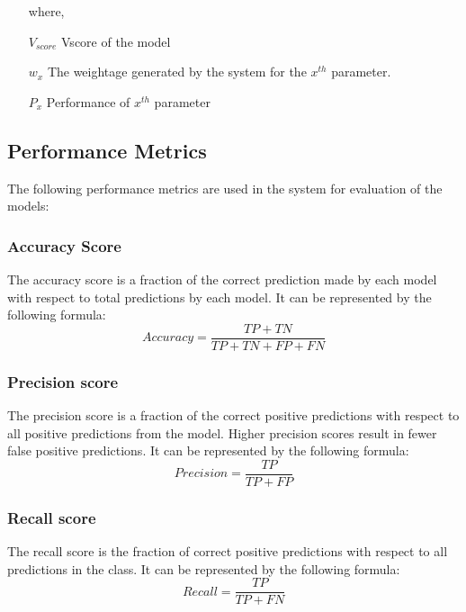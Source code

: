 \documentclass[a4paper,fleqn]{cas-dc}
\newcommand{\responsemod}{\color{blue}}
\begin{document}
{\responsemod
\begin{itemize}
    \item[where,]
    \item[$V_{score}$] Vscore of the model
    \item[$w_x$] The weightage generated by the system for the $x^{th}$ parameter.
    \item[$P_x$] Performance of $x^{th}$ parameter
\end{itemize}

\subsection{Performance Metrics} \label{subsec:performance_metrics}
The following performance metrics are used in the system for evaluation of the models:

\subsubsection{Accuracy Score}\label{subsubsec:accuracy_score}
The accuracy score is a fraction of the correct prediction made by each model with respect to total predictions by each model. It can be represented by the following formula:
\begin{equation*}\label{eq:accuracy_score}
    Accuracy = \frac{TP+TN}{TP+TN+FP+FN}
\end{equation*}

\subsubsection{Precision score}\label{subsubsec:precision_score}
The precision score is a fraction of the correct positive predictions with respect to all positive predictions from the model. Higher precision scores result in fewer false positive predictions. It can be represented by the following formula:
\begin{equation*}\label{eq:precision_score}
    Precision = \frac{TP}{TP+FP}
\end{equation*}

\subsubsection{Recall score}\label{subsubsec:recall_score}
The recall score is the fraction of correct positive predictions with respect to all predictions in the class. It can be represented by the following formula:
\begin{equation*}\label{eq:recall_score}
    Recall = \frac{TP}{TP+FN}
\end{equation*}

}
\end{document}
